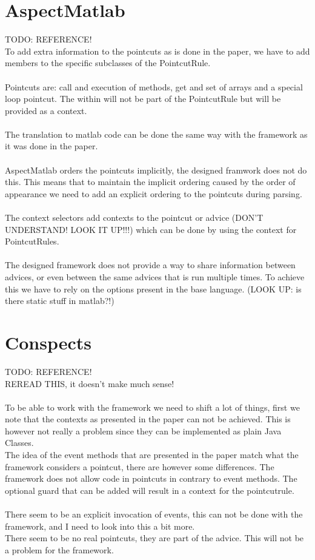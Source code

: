 \documentclass[a4paper]{report}
\begin{document}
\section{AspectMatlab}
TODO: REFERENCE!\\
To add extra information to the pointcuts as is done in the paper, we have to add members to the specific subclasses of the PointcutRule.\\
\\
Pointcuts are: call and execution of methods, get and set of arrays and a special loop pointcut. The within will not be part of the PointcutRule but will be provided as a context.\\
\\
The translation to matlab code can be done the same way with the framework as it was done in the paper.\\
\\
AspectMatlab orders the pointcuts implicitly, the designed framwork does not do this. This means that to maintain the implicit ordering caused by the order of appearance we need to add an explicit ordering to the pointcuts during parsing.\\
\\
The context selectors add contexts to the pointcut or advice (DON'T UNDERSTAND! LOOK IT UP!!!) which can be done by using the context for PointcutRules.\\
\\
The designed framework does not provide a way to share information between advices, or even between the same advices that is run multiple times. To achieve this we have to rely on the options present in the base language. (LOOK UP: is there static stuff in matlab?!)
\section{Conspects}
TODO: REFERENCE!\\
REREAD THIS, it doesn't make much sense!\\
\\
To be able to work with the framework we need to shift a lot of things, first we note that the contexts as presented in the paper can not be achieved. This is however not really a problem since they can be implemented as plain Java Classes.\\
The idea of the event methods that are presented in the paper match what the framework considers a pointcut, there are however some differences. The framework does not allow code in pointcuts in contrary to event methods. The optional guard that can be added will result in a context for the pointcutrule.\\
\\
There seem to be an explicit invocation of events, this can not be done with the framework, and I need to look into this a bit more.\\
There seem to be no real pointcuts, they are part of the advice. This will not be a problem for the framework.
\end{document}
